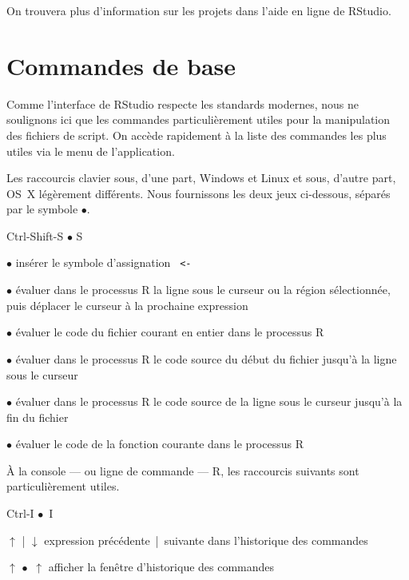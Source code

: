 On trouvera plus d'information sur les projets dans l'aide en ligne
de RStudio.



\section{Commandes de base}
\label{rstudio:commandes}

Comme l'interface de RStudio respecte les standards modernes, nous ne
soulignons ici que les commandes particulièrement utiles pour la
manipulation des fichiers de script. On accède rapidement à la liste
des commandes les plus utiles via le menu  de
l'application.

Les raccourcis clavier sous, d'une part, Windows et Linux et sous,
d'autre part, OS~X légèrement différents. Nous fournissons les deux
jeux ci-dessous, séparés par le symbole $\bullet$.

\begin{ttscript}{Ctrl-Shift-S $\bullet$ \cmdkey\shiftkey S}
  \raggedright
\item[\code{Alt+-} $\bullet$ \code{\optkey\,-}] insérer le
  symbole d'assignation \verb*| <- |
\item[\code{Ctrl+Retour} $\bullet$ \code{\cmdkey\,\returnkey}]
  évaluer dans le processus R la ligne sous le curseur ou la région
  sélectionnée, puis déplacer le curseur à la prochaine expression
\item[\code{Ctrl+Shift+S} $\bullet$ \code{\shiftkey\,\cmdkey\,S}]
  évaluer le code du fichier courant en entier dans le processus R
\item[\code{Ctrl+Alt+B} $\bullet$ \code{\optkey\,\cmdkey\,B}]
  évaluer dans le processus R le code source du début du fichier
  jusqu'à la ligne sous le curseur
\item[\code{Ctrl+Alt+E} $\bullet$ \code{\optkey\,\cmdkey\,E}]
  évaluer dans le processus R le code source de la ligne sous le curseur
  jusqu'à la fin du fichier
\item[\code{Ctrl+Alt+F} $\bullet$ \code{\optkey\,\cmdkey\,F}]
  évaluer le code de la fonction courante dans le processus R
\end{ttscript}

À la console --- ou ligne de commande --- R, les raccourcis suivants
sont particulièrement utiles.
\begin{ttscript}{Ctrl-I $\bullet$ \cmdkey\,I}
  \raggedright
\item[$\uparrow$ | $\downarrow$] expression
  précédente~|~suivante dans l'historique des commandes
\item[\code{Ctrl+}$\uparrow$ $\bullet$ \cmdkey\,$\uparrow$] afficher
  la fenêtre d'historique des commandes
\end{ttscript}


